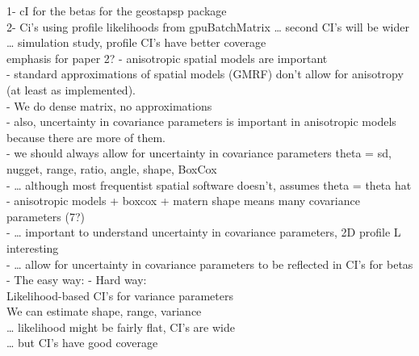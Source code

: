 \documentclass{article}\usepackage[]{graphicx}\usepackage[]{color}
\begin{document}
1- cI for the betas for the geostapsp package\\
2- Ci’s using profile likelihoods from gpuBatchMatrix
… second CI’s will be wider\\
… simulation study, profile CI’s have better coverage\\


emphasis for paper 2?
- anisotropic spatial models are important\\
- standard approximations of spatial models (GMRF) don’t allow for anisotropy (at least as implemented).  \\
- We do dense matrix, no approximations\\
- also, uncertainty in covariance parameters is important in anisotropic models because there are more of them.\\


- we should always allow for uncertainty in covariance parameters theta = sd, nugget, range, ratio, angle, shape, BoxCox\\
- … although most frequentist spatial software doesn’t, assumes theta = theta hat\\
- anisotropic models + boxcox + matern shape means many covariance parameters (7?)\\
- … important to understand uncertainty in covariance parameters, 2D profile L interesting\\
- … allow for uncertainty in covariance parameters to be reflected in CI’s for betas\\


- The easy way:  %
- Hard way:\\  %
Likelihood-based CI’s for variance parameters\\

We can estimate shape, range, variance\\
… likelihood might be fairly flat, CI’s are wide\\
… but CI’s have good coverage
\end{document}
